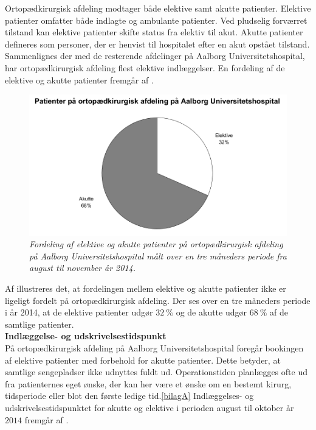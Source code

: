 Ortopædkirurgisk afdeling modtager både elektive samt akutte patienter. Elektive patienter omfatter både indlagte og ambulante patienter. Ved pludselig forværret tilstand kan elektive patienter skifte status fra elektiv til akut. Akutte patienter defineres som personer, der er henvist til hospitalet efter en akut opstået tilstand. Sammenlignes der med de resterende afdelinger på Aalborg Universitetshospital, har ortopædkirurgisk afdeling flest elektive indlæggelser.\cite{RegionNord2016} En fordeling af de elektive og akutte patienter fremgår af .

\begin{figure}[H]
	\flushleft 
	\centering
	\includegraphics[scale=0.55]{figures/elektivvsakut.png}
	\flushleft
	\caption{\textit{Fordeling af elektive og akutte patienter på ortopædkirurgisk afdeling på Aalborg Universitetshospital målt over en tre måneders periode fra august til november år 2014.}}
	\label{elektivvsakut}
	\end{figure}

\noindent
Af  illustreres det, at fordelingen mellem elektive og akutte patienter ikke er ligeligt fordelt på ortopædkirurgisk afdeling. Der ses over en tre måneders periode i år 2014, at de elektive patienter udgør $32~\%$ og de akutte udgør $68~\%$ af de samtlige patienter. \\

\noindent
\textbf{Indlæggelse- og udskrivelsestidspunkt} \\
På ortopædkirurgisk afdeling på Aalborg Universitetshospital foregår bookingen af elektive patienter med forbehold for akutte patienter. Dette betyder, at samtlige sengepladser ikke udnyttes fuldt ud. Operationstiden planlægges ofte ud fra patienternes eget ønske, der kan her være et ønske om en bestemt kirurg, tidsperiode eller blot den første ledige tid.\ref{bilagA} Indlæggelses- og udskrivelsestidspunktet for akutte og elektive i perioden august til oktober år $2014$ fremgår af . 


